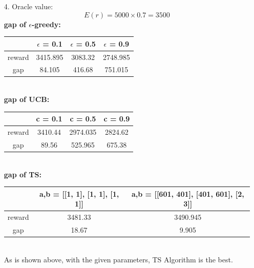 \documentclass{article}
\begin{document}
\begin{homeworkProblem}
\begin{enumerate}
        \item[4.]
        Oracle value:$$E(r) = 5000\times0.7 = 3500$$
        \textbf{gap of $\epsilon$-greedy:}\\
        \begin{tabular}[t]{|c|c|c|c|}
        \hline
         & $\epsilon$ = 0.1 & $\epsilon$ = 0.5 & $\epsilon$ = 0.9 \\
        \hline
        reward & 3415.895 & 3083.32 & 2748.985 \\
        \hline
        gap & 84.105 & 416.68 & 751.015 \\
        \hline
        \end{tabular}\\

        \textbf{gap of UCB:}\\
        \begin{tabular}[t]{|c|c|c|c|}
        \hline
         & c = 0.1 & c = 0.5 & c = 0.9 \\
        \hline
        reward & 3410.44 & 2974.035 & 2824.62 \\
        \hline
        gap & 89.56 & 525.965 & 675.38 \\
        \hline
        \end{tabular}\\

        \textbf{gap of TS:}\\
        \begin{tabular}[t]{|c|c|c|}
        \hline
         & a,b = [[1, 1], [1, 1], [1, 1]] & a,b = [[601, 401], [401, 601], [2, 3]]\\
        \hline
        reward & 3481.33 & 3490.945 \\
        \hline
        gap & 18.67 & 9.905 \\
        \hline
        \end{tabular}\\

        As is shown above, with the given parameters, TS Algorithm is the best.\\
        

\end{enumerate}
\end{homeworkProblem}
\end{document}
